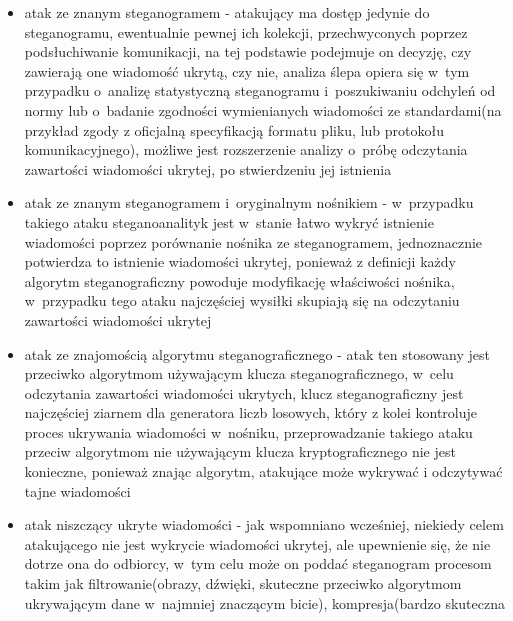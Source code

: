 \documentclass[a4paper, twoside, 12pt]{report}
\begin{document}
        \begin{itemize}
            \item atak ze znanym steganogramem - atakujący ma dostęp jedynie do
                steganogramu, ewentualnie pewnej ich kolekcji, przechwyconych poprzez
                podsłuchiwanie komunikacji, na tej podstawie podejmuje on decyzję,
                czy zawierają one wiadomość ukrytą, czy nie, analiza ślepa opiera
                się w~tym przypadku o~analizę statystyczną steganogramu i~poszukiwaniu
                odchyleń od normy lub o~badanie zgodności wymienianych wiadomości
                ze standardami(na przykład zgody z oficjalną specyfikacją formatu pliku,
                lub protokołu komunikacyjnego), możliwe jest rozszerzenie
                analizy o~próbę odczytania zawartości wiadomości ukrytej, po stwierdzeniu
                jej istnienia
            \item atak ze znanym steganogramem i~oryginalnym nośnikiem - w~przypadku
                takiego ataku steganoanalityk jest w~stanie łatwo wykryć istnienie
                wiadomości poprzez porównanie nośnika ze steganogramem, jednoznacznie
                potwierdza to istnienie wiadomości ukrytej, ponieważ z definicji
                każdy algorytm steganograficzny powoduje modyfikację właściwości
                nośnika, w~przypadku tego ataku najczęściej wysiłki skupiają się
                na odczytaniu zawartości wiadomości ukrytej
            \item atak ze znajomością algorytmu steganograficznego - atak ten
                stosowany jest przeciwko algorytmom używającym klucza steganograficznego,
                w~celu odczytania zawartości wiadomości ukrytych, klucz steganograficzny
                jest najczęściej ziarnem dla generatora liczb losowych, który z
                kolei kontroluje proces ukrywania wiadomości w~nośniku, przeprowadzanie
                takiego ataku przeciw algorytmom nie używającym klucza kryptograficznego
                nie jest konieczne, ponieważ znając algorytm, atakujące może wykrywać i
                odczytywać tajne wiadomości
            \item atak niszczący ukryte wiadomości - jak wspomniano wcześniej, niekiedy
                celem atakującego nie jest wykrycie wiadomości ukrytej, ale upewnienie
                się, że nie dotrze ona do odbiorcy, w~tym celu może on poddać steganogram
                procesom takim jak filtrowanie(obrazy, dźwięki, skuteczne przeciwko
                algorytmom ukrywającym dane w~najmniej znaczącym bicie), kompresja(bardzo skuteczna

\end{itemize}
\end{document}
